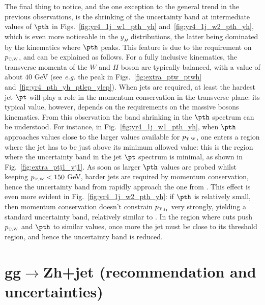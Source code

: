 The final thing to notice, and the one exception to the general trend
in the previous observations, is the shrinking of the uncertainty band
at intermediate values of $\pth$ in Figs.~\ref{fig:yr4_1j_w1_pth_yh}
and~\ref{fig:yr4_1j_w2_pth_yh}, which is even more noticeable in the
$y_H$ distributions, the latter being dominated by the kinematics
where $\pth$ peaks. This feature is due to the requirement on $p_{\scriptscriptstyle \mathrm{T,W}}$,
and can be explained as follows. For a fully inclusive kinematics, the
transverse momenta of the $W$ and $H$ boson are typically balanced,
with a value of about $40$ GeV (see \emph{e.g.} the peak in
Figs.~\ref{fig:extra_ptw_ptwh}
and~\ref{fig:yr4_pth_yh_ptlep_ylep}). When jets are required, at least
the hardest jet $\pt$ will play a role in the momentum conservation in
the transverse plane: its typical value, however, depends on the
requirements on the massive bosons kinematics. From this observation
the band shrinking in the $\pth$ spectrum can be understood. For
instance, in Fig.~\ref{fig:yr4_1j_w1_pth_yh}, when $\pth$ approaches
values close to the larger values available for $p_{\scriptscriptstyle \mathrm{T,W}}$, one enters a
region where the jet has to be just above its minimum allowed value:
this is the region where the uncertainty band in the jet $\pt$
spectrum is minimal, as shown in Fig.~\ref{fig:extra_ptj1_yj1}. As
soon as larger $\pth$ values are probed whilst keeping $p_{\scriptscriptstyle \mathrm{T,W}}<150$ GeV,
harder jets are required by momentum conservation, hence the
uncertainty band from \HVNNLOPS{} rapidly approach the one from
\HWJMINLO{}.  This effect is even more evident in
Fig.~\ref{fig:yr4_1j_w2_pth_yh}: if $\pth$ is relatively small, then
momentum conservation doesn't constrain $p_{\scriptscriptstyle \mathrm{T,j_{1}}}$ very strongly,
yielding a standard uncertainty band, relatively similar to
\HWJMINLO{}. In the region where cuts push $p_{\scriptscriptstyle \mathrm{T,W}}$ and $\pth$ to
similar values, once more the jet must be close to its threshold
region, and hence the uncertainty band is reduced.

\section{gg$\to$Zh+jet  (recommendation and uncertainties)}
